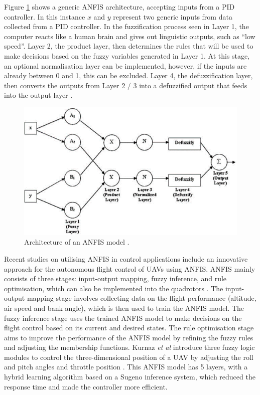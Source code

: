 Figure \ref{fig:anfis} shows a generic ANFIS architecture, accepting inputs from a PID controller. In this instance $x$ and $y$ represent two generic inputs from data collected from a PID controller. In the fuzzification process seen in Layer 1, the computer reacts like a human brain and gives out linguistic outputs, such as ``low speed''. Layer 2, the product layer, then determines the rules that will be used to make decisions based on the fuzzy variables generated in Layer 1. At this stage, an optional normalisation layer can be implemented, however, if the inputs are already between 0 and 1, this can be excluded. Layer 4, the defuzzification layer, then converts the outputs from Layer 2 / 3 into a defuzzified output that feeds into the output layer \cite{boxi2}. 
\begin{figure}[H]
    \centering
    \includegraphics[width = 0.8 \textwidth]{img/Picture1.png}
    \caption[Architecture of an ANFIS model.]{Architecture of an ANFIS model \cite{boxi2}.}
    \label{fig:anfis}
\end{figure}
Recent studies on utilising ANFIS in control applications include an innovative approach for the autonomous flight control of UAVs using ANFIS. ANFIS mainly consists of three stages: input-output mapping, fuzzy inference, and rule optimisation, which can also be implemented into the quadrotors \cite{boxi4}. The input-output mapping stage involves collecting data on the flight performance (altitude, air speed and bank angle), which is then used to train the ANFIS model. The fuzzy inference stage uses the trained ANFIS model to make decisions on the  flight control based on its current and desired states. The rule optimisation stage aims to improve the performance of the ANFIS model by refining the fuzzy rules and adjusting the membership functions. Kurnaz \textit{et al} introduce three fuzzy logic modules to control the three-dimensional position of a UAV by adjusting the roll and pitch angles and throttle position \cite{boxi3}. This ANFIS model has 5 layers, with a hybrid learning algorithm based on a Sugeno inference system, which reduced the response time and made the controller more efficient. 

